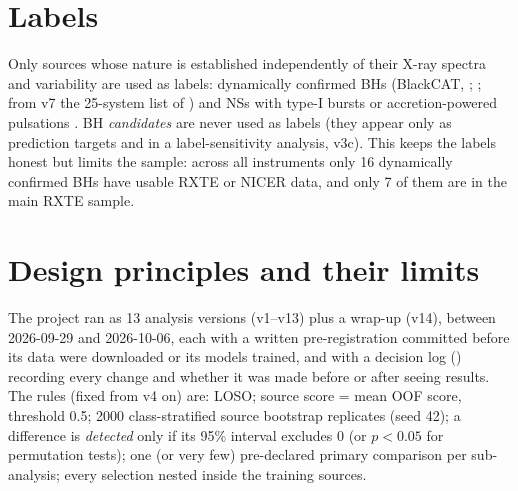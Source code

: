 \section{Labels}\label{sec:intro-labels}

Only sources whose nature is established independently of their X-ray spectra and variability are used as labels:
dynamically confirmed BHs (BlackCAT, \citealt{CorralSantana2016}; \citealt{CasaresJonker2014}; from v7 the 25-system list of
\citealt{Marcel2026}) and NSs with type-I bursts \citep{Galloway2008,Galloway2020} or accretion-powered pulsations
\citep{PatrunoWatts2021}. BH \emph{candidates} are never used as labels (they appear only as prediction targets and in a
label-sensitivity analysis, v3c). This keeps the labels honest but limits the sample: across all instruments only 16
dynamically confirmed BHs have usable RXTE or NICER data, and only 7 of them are in the main RXTE sample.

\section{Design principles and their limits}\label{sec:principles}

The project ran as 13 analysis versions (v1--v13) plus a wrap-up (v14), between 2026-09-29 and 2026-10-06, each with a
written pre-registration committed before its data were downloaded or its models trained, and with a decision log
() recording every change and whether it was made before or after seeing results. The
rules (fixed from v4 on) are: LOSO; source score = mean OOF score, threshold 0.5; 2000 class-stratified source bootstrap
replicates (seed 42); a difference is \emph{detected} only if its 95\% interval excludes 0 (or $p<0.05$ for permutation
tests); one (or very few) pre-declared primary comparison per sub-analysis; every selection nested inside the training
sources.

